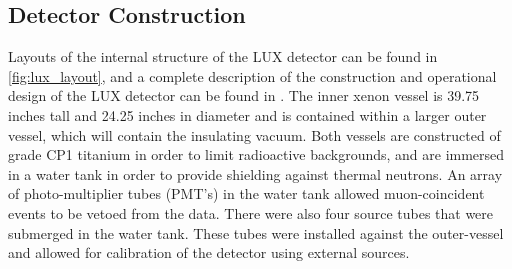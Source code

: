 \subsection{Detector Construction}
Layouts of the internal structure of the LUX detector can be found in \ref{fig:lux_layout}, and a complete description of the construction and operational design of the LUX detector can be found in \cite{lux2012}. The inner xenon vessel is 39.75 inches tall and 24.25 inches in diameter and is contained within a larger outer vessel, which will contain the insulating vacuum. Both vessels are constructed of grade CP1 titanium in order to limit radioactive backgrounds, and are immersed in a water tank in order to provide shielding against thermal neutrons. An array of photo-multiplier tubes (PMT's) in the water tank allowed muon-coincident events to be vetoed from the data. There were also four source tubes that were submerged in the water tank. These tubes were installed against the outer-vessel and allowed for calibration of the detector using external sources.
